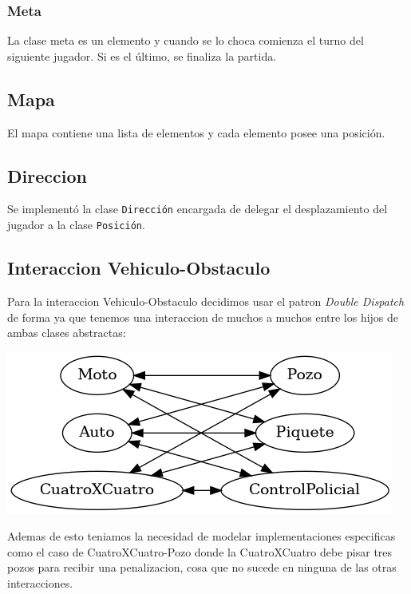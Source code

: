 \documentclass[titlepage,a4paper]{article}
\begin{document}
\subsubsection{Meta}
\label{sec:org25e62a9}
La clase meta es un elemento y cuando se lo choca comienza el turno
del siguiente jugador. Si es el último, se finaliza la partida.

\subsection{Mapa}
\label{sec:orgd1a260a}

El mapa contiene una lista de elementos y cada elemento posee una posición.

\subsection{Direccion}
\label{sec:org873f4eb}
Se implementó la clase \texttt{Dirección} encargada de delegar el
desplazamiento del jugador a la clase \texttt{Posición}.

\subsection{Interaccion Vehiculo-Obstaculo}
\label{sec:orgb61bc50}

Para la interaccion Vehiculo-Obstaculo decidimos usar el patron \emph{Double
Dispatch} de forma ya que tenemos una interaccion de muchos a muchos entre los
hijos de ambas clases abstractas:

\begin{center}
\includegraphics[width=.9\linewidth]{diagramas/interaccionVehiculoObstaculo.png}
\end{center}

Ademas de esto teniamos la necesidad de modelar implementaciones especificas
como el caso de CuatroXCuatro-Pozo donde la CuatroXCuatro debe pisar tres pozos
para recibir una penalizacion, cosa que no sucede en ninguna de las otras interacciones.
\end{document}
